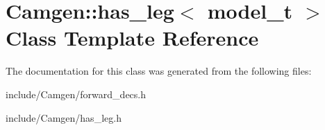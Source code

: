 \hypertarget{a00264}{}\section{Camgen\+:\+:has\+\_\+leg$<$ model\+\_\+t $>$ Class Template Reference}
\label{a00264}


The documentation for this class was generated from the following files\+:\begin{DoxyCompactItemize}
\item 
include/\+Camgen/forward\+\_\+decs.\+h\item 
include/\+Camgen/has\+\_\+leg.\+h\end{DoxyCompactItemize}
